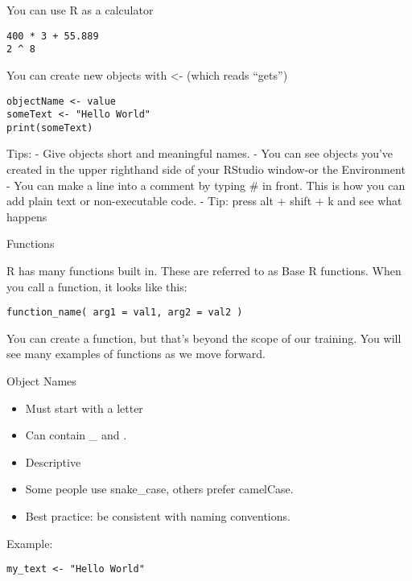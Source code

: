 \documentclass[ignorenonframetext,]{beamer}
\providecommand{\tightlist}{%
  \setlength{\itemsep}{0pt}\setlength{\parskip}{0pt}}
\begin{document}
\begin{frame}[fragile]{You can use R as a calculator}

\begin{verbatim}
400 * 3 + 55.889
2 ^ 8
\end{verbatim}

You can create new objects with \textless{}- (which reads ``gets'')

\begin{verbatim}
objectName <- value
someText <- "Hello World"
print(someText)
\end{verbatim}

Tips: - Give objects short and meaningful names. - You can see objects
you've created in the upper righthand side of your RStudio window-or the
Environment - You can make a line into a comment by typing \# in front.
This is how you can add plain text or non-executable code. - Tip: press
alt + shift + k and see what happens

\end{frame}

\begin{frame}[fragile]{Functions}

R has many functions built in. These are referred to as Base R
functions. When you call a function, it looks like this:

\begin{verbatim}
function_name( arg1 = val1, arg2 = val2 )
\end{verbatim}

You can create a function, but that's beyond the scope of our training.
You will see many examples of functions as we move forward.

\end{frame}

\begin{frame}[fragile]{Object Names}

\begin{itemize}
\tightlist
\item
  Must start with a letter
\item
  Can contain \_ and .
\item
  Descriptive
\item
  Some people use snake\_case, others prefer camelCase.
\item
  Best practice: be consistent with naming conventions.
\end{itemize}

Example:

\begin{verbatim}
my_text <- "Hello World"
\end{verbatim}

\end{frame}
\end{document}
